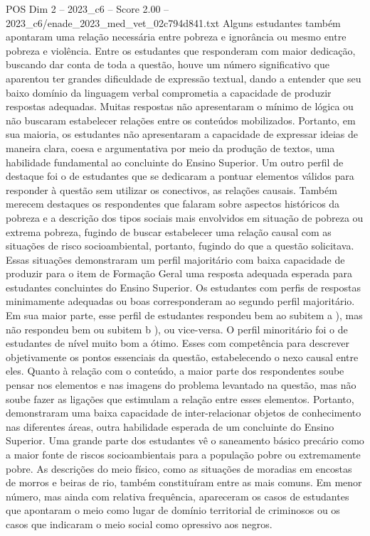 \begin{textsample}{POS Dim 2 – 2023\_c6 – Score 2.00 – 2023\_c6/enade\_2023\_med\_vet\_02c794d841.txt}
Alguns estudantes também apontaram uma relação necessária entre pobreza e ignorância ou mesmo entre pobreza e violência.
Entre os estudantes que responderam com maior dedicação, buscando dar conta de toda a questão, houve um número significativo que aparentou ter grandes dificuldade de expressão textual, dando a entender que seu baixo domínio da linguagem verbal comprometia a capacidade de produzir respostas adequadas.
Muitas respostas não apresentaram o mínimo de lógica ou não buscaram estabelecer relações entre os conteúdos mobilizados.
Portanto, em sua maioria, os estudantes não apresentaram a capacidade de expressar ideias de maneira clara, coesa e argumentativa por meio da produção de textos, uma habilidade fundamental ao concluinte do Ensino Superior.
Um outro perfil de destaque foi o de estudantes que se dedicaram a pontuar elementos válidos para responder à questão sem utilizar os conectivos, as relações causais.
Também merecem destaques os respondentes que falaram sobre aspectos históricos da pobreza e a descrição dos tipos sociais mais envolvidos em situação de pobreza ou extrema pobreza, fugindo de buscar estabelecer uma relação causal com as situações de risco socioambiental, portanto, fugindo do que a questão solicitava.
Essas situações demonstraram um perfil majoritário com baixa capacidade de produzir para o item de Formação Geral uma resposta adequada esperada para estudantes concluintes do Ensino Superior.
Os estudantes com perfis de respostas minimamente adequadas ou boas corresponderam ao segundo perfil majoritário.
Em sua maior parte, esse perfil de estudantes respondeu bem ao subitem a ), mas não respondeu bem ou subitem b ), ou vice-versa.
O perfil minoritário foi o de estudantes de nível muito bom a ótimo.
Esses com competência para descrever objetivamente os pontos essenciais da questão, estabelecendo o nexo causal entre eles.
Quanto à relação com o conteúdo, a maior parte dos respondentes soube pensar nos elementos e nas imagens do problema levantado na questão, mas não soube fazer as ligações que estimulam a relação entre esses elementos.
Portanto, demonstraram uma baixa capacidade de inter-relacionar objetos de conhecimento nas diferentes áreas, outra habilidade esperada de um concluinte do Ensino Superior.
Uma grande parte dos estudantes vê o saneamento básico precário como a maior fonte de riscos socioambientais para a população pobre ou extremamente pobre.
As descrições do meio físico, como as situações de moradias em encostas de morros e beiras de rio, também constituíram entre as mais comuns.
Em menor número, mas ainda com relativa frequência, apareceram os casos de estudantes que apontaram o meio como lugar de domínio territorial de criminosos ou os casos que indicaram o meio social como opressivo aos negros.

\end{textsample}
